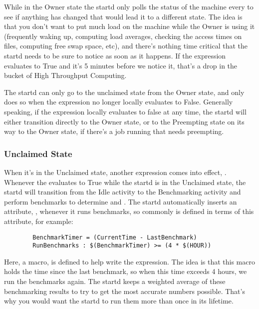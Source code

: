 While in the Owner state the startd only polls the status of the
machine every  to see if anything has changed
that would lead it to a different state.  The idea is that you don't
want to put much load on the machine while the Owner is using it
(frequently waking up, computing load averages, checking the access
times on files, computing free swap space, etc), and there's nothing
time critical that the startd needs to be sure to notice as soon as it
happens.  If the  expression evaluates to True and it's 5
minutes before we notice it, that's a drop in the bucket of High
Throughput Computing.

The startd can only go to the unclaimed state from the Owner state,
and only does so when the  expression no longer locally
evaluates to False.  Generally speaking, if the 
expression locally evaluates to false at any time, the startd will
either transition directly to the Owner state, or to the Preempting
state on its way to the Owner state, if there's a job running that
needs preempting.

\subsubsection{Unclaimed State}
\label{sec:Unclaimed-State}

When it's in the Unclaimed state, another expression comes into
effect,  \label{param:RunBenchmarks}.  Whenever
the  evaluates to True while the startd is in the
Unclaimed state, the startd will transition from the Idle activity to
the Benchmarking activity and perform benchmarks to determine
 and .  The startd automatically inserts an
attribute, , whenever it runs benchmarks, so
commonly  is defined in terms of this attribute,
for example:

\begin{verbatim}
        BenchmarkTimer = (CurrentTime - LastBenchmark)
        RunBenchmarks : $(BenchmarkTimer) >= (4 * $(HOUR))
\end{verbatim}

Here, a macro,  is defined to help write the
expression.  The idea is that this macro holds the time since the last
benchmark, so when this time exceeds 4 hours, we run the benchmarks
again.  The startd keeps a weighted average of these benchmarking
results to try to get the most accurate numbers possible.  That's why
you would want the startd to run them more than once in its lifetime.

